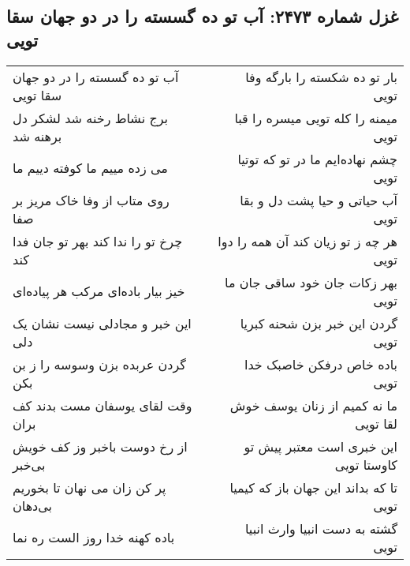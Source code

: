 \begin{center}
\section*{غزل شماره ۲۴۷۳: آب تو ده گسسته را در دو جهان سقا تویی}
\label{sec:2473}
\begin{longtable}{l p{0.5cm} r}
آب تو ده گسسته را در دو جهان سقا تویی
&&
بار تو ده شکسته را بارگه وفا تویی
\\
برج نشاط رخنه شد لشکر دل برهنه شد
&&
میمنه را کله تویی میسره را قبا تویی
\\
می زده مییم ما کوفته دییم ما
&&
چشم نهاده‌ایم ما در تو که توتیا تویی
\\
روی متاب از وفا خاک مریز بر صفا
&&
آب حیاتی و حیا پشت دل و بقا تویی
\\
چرخ تو را ندا کند بهر تو جان فدا کند
&&
هر چه ز تو زیان کند آن همه را دوا تویی
\\
خیز بیار باده‌ای مرکب هر پیاده‌ای
&&
بهر زکات جان خود ساقی جان ما تویی
\\
این خبر و مجادلی نیست نشان یک دلی
&&
گردن این خبر بزن شحنه کبریا تویی
\\
گردن عربده بزن وسوسه را ز بن بکن
&&
باده خاص درفکن خاصبک خدا تویی
\\
وقت لقای یوسفان مست بدند کف بران
&&
ما نه کمیم از زنان یوسف خوش لقا تویی
\\
از رخ دوست باخبر وز کف خویش بی‌خبر
&&
این خبری است معتبر پیش تو کاوستا تویی
\\
پر کن زان می نهان تا بخوریم بی‌دهان
&&
تا که بداند این جهان باز که کیمیا تویی
\\
باده کهنه خدا روز الست ره نما
&&
گشته به دست انبیا وارث انبیا تویی
\\
\end{longtable}
\end{center}
